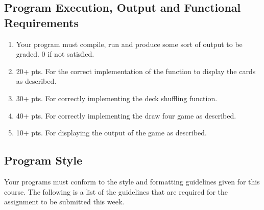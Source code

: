\documentclass[11pt]{article}
\begin{document}
\subsection*{Program Execution, Output and Functional Requirements}
\label{sec-5-1}

\begin{enumerate}
\item Your program must compile, run and produce some sort of output to
be graded. 0 if not satisfied.
\item 20+ pts. For the correct implementation of the function to display the
cards as described.
\item 30+ pts. For correctly implementing the deck shuffling function.
\item 40+ pts. For correctly implementing the draw four game as described.
\item 10+ pts. For displaying the output of the game as described.
\end{enumerate}

\subsection*{Program Style}
\label{sec-5-2}

Your programs must conform to the style and formatting guidelines
given for this course.  The following is a list of the guidelines that
are required for the assignment to be submitted this week.
\end{document}
